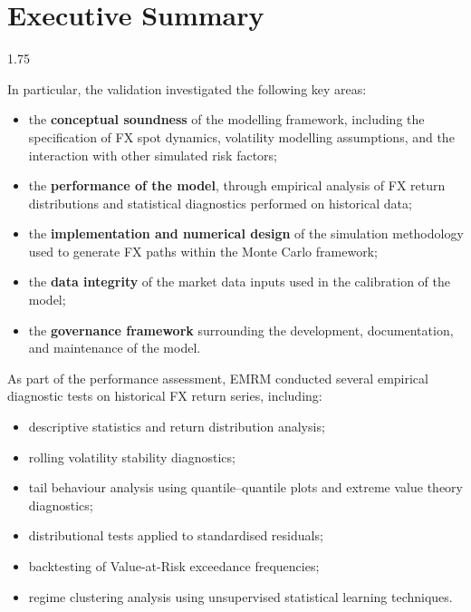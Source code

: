 \section{Executive Summary}\label{ExecutiveSummary}
\begin{spacing}{1.75}
	
 
	In particular, the validation investigated the following key areas:
	
	\begin{itemize}
		\item the \textbf{conceptual soundness} of the modelling framework, including the specification of FX spot dynamics, volatility modelling assumptions, and the interaction with other simulated risk factors;
		\item the \textbf{performance of the model}, through empirical analysis of FX return distributions and statistical diagnostics performed on historical data;
		\item the \textbf{implementation and numerical design} of the simulation methodology used to generate FX paths within the Monte Carlo framework;
		\item the \textbf{data integrity} of the market data inputs used in the calibration of the model;
		\item the \textbf{governance framework} surrounding the development, documentation, and maintenance of the model.
	\end{itemize}
	
	As part of the performance assessment, EMRM conducted several empirical diagnostic tests on historical FX return series, including:
	
	\begin{itemize}
		\item descriptive statistics and return distribution analysis;
		\item rolling volatility stability diagnostics;
		\item tail behaviour analysis using quantile–quantile plots and extreme value theory diagnostics;
		\item distributional tests applied to standardised residuals;
		\item backtesting of Value-at-Risk exceedance frequencies;
		\item regime clustering analysis using unsupervised statistical learning techniques.
	\end{itemize}
	

\end{spacing}
